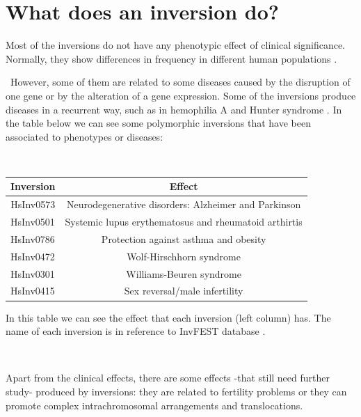 \documentclass[a4paper,12pt]{article}
\begin{document}
\section{What does an inversion do?}
Most of the inversions do not have any phenotypic effect of clinical significance. Normally, they show differences in frequency in different human populations \cite{puig_human_2015}. 

\
However, some of them are related to some diseases caused by the disruption of one gene or by the alteration of a gene expression. Some of the inversions produce diseases in a recurrent way, such as in hemophilia A and Hunter syndrome \cite{puig_human_2015}. In the table below we can see some polymorphic inversions that have been associated to phenotypes or diseases:

\

\begin{table}[!htb] %
\centering
\begin{tabular}{|l|c|}
\hline
\multicolumn{1}{|c|}{\textbf{Inversion}} & \textbf{Effect}                                       \\ \hline
\multicolumn{1}{|c|}{HsInv0573}          & Neurodegenerative disorders: Alzheimer and Parkinson  \\ \hline
HsInv0501                                & Systemic lupus erythematosus and rheumatoid arthirtis \\ \hline
HsInv0786                                & Protection against asthma and obesity                 \\ \hline
HsInv0472                                & Wolf-Hirschhorn syndrome                              \\ \hline
HsInv0301                                & Williams-Beuren syndrome                              \\ \hline
HsInv0415                                & Sex reversal/male infertility                         \\ \hline
\end{tabular}
\begin{tablenotes}
\small
\item In this table we can see the effect that each inversion (left column) has. The name of each inversion is in reference to InvFEST database \cite{martinez-fundichely_invfest_2014}.
\end{tablenotes}
\end{table}

\

Apart from the clinical effects, there are some effects -that still need further study- produced by inversions: they are related to fertility problems or they can promote complex intrachromosomal arrangements and translocations. 
\newpage


\end{document}
